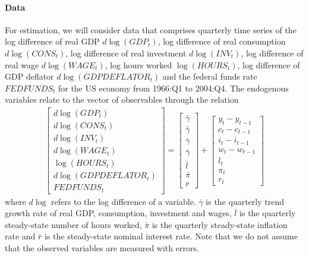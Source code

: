 \documentclass{article}
\begin{document}
\paragraph{Data}
For estimation, we will consider data that comprises quarterly time series of the log difference of real GDP $d\log(GDP_t)$,
  log difference of real consumption $d\log(CONS_t)$, log difference of real investment $d\log(INV_t)$, log difference of real wage $d\log(WAGE_t)$,
  log hours worked $\log(HOURS_t)$, log difference of GDP deflator $d\log(GDPDEFLATOR_t)$ and the federal funds rate $FEDFUNDS_t$ for the US economy from 1966:Q1 to 2004:Q4.
The endogenous variables relate to the vector of observables through the relation
\begin{align}
	\begin{bmatrix} d\log(GDP_t)\\ d\log(CONS_t)\\ d\log(INV_t)\\ d\log(WAGE_t)\\ \log(HOURS_t)\\ d\log(GDPDEFLATOR_t)\\ FEDFUNDS_t\end{bmatrix}
	= \begin{bmatrix} \bar{\gamma}\\ \bar{\gamma}\\ \bar{\gamma}\\ \bar{\gamma}\\ \bar{l}\\ \bar{\pi}\\ \bar{r} \end{bmatrix}
	+ \begin{bmatrix} y_t - y_{t-1}\\c_t - c_{t-1}\\i_t - i_{t-1}\\w_t - w_{t-1}\\l_t\\\pi_t\\r_t\end{bmatrix} \label{eq:SW2007_measurement_equations}
\end{align}
where $d\log$ refers to the log difference of a variable.
$\bar{\gamma}$ is the quarterly trend growth rate of real GDP, consumption, investment and wages, 
  $\bar{l}$ is the quarterly steady-state number of hours worked,
  $\bar{\pi}$ is the quarterly steady-state inflation rate and 
  $\bar{r}$ is the steady-state nominal interest rate.
Note that we do not assume that the observed variables are measured with errors.
\end{document}
